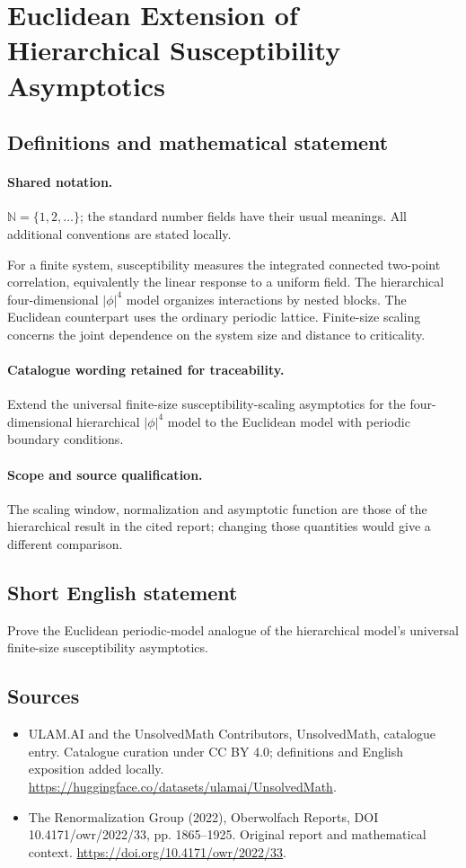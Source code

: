 \documentclass[11pt]{article}
\begin{document}
\section{Euclidean Extension of Hierarchical Susceptibility Asymptotics}\label{statement}

\subsection{Definitions and mathematical statement}

\paragraph{Shared notation.}$\mathbb N=\{1,2,\ldots\}$; the standard number fields have their usual meanings. All additional conventions are stated locally.


For a finite system, susceptibility measures the integrated connected two-point correlation, equivalently the linear response to a uniform field. The hierarchical four-dimensional $|\phi|^4$ model organizes interactions by nested blocks. The Euclidean counterpart uses the ordinary periodic lattice. Finite-size scaling concerns the joint dependence on the system size and distance to criticality.

\paragraph{Catalogue wording retained for traceability.}
Extend the universal finite-size susceptibility-scaling asymptotics for the four-dimensional hierarchical $|\phi|^4$ model to the Euclidean model with periodic boundary conditions.

\paragraph{Scope and source qualification.}The scaling window, normalization and asymptotic function are those of the hierarchical result in the cited report; changing those quantities would give a different comparison.
\subsection{Short English statement}
Prove the Euclidean periodic-model analogue of the hierarchical model's universal finite-size susceptibility asymptotics.
\subsection{Sources}
\begin{itemize}
\item[\hypertarget{source:statement:1}{S1}] ULAM.AI and the UnsolvedMath Contributors, UnsolvedMath, catalogue entry. Catalogue curation under CC BY 4.0; definitions and English exposition added locally.
\url{https://huggingface.co/datasets/ulamai/UnsolvedMath}.
\item[\hypertarget{source:statement:2}{S2}] The Renormalization Group (2022), Oberwolfach Reports, DOI 10.4171/owr/2022/33, pp. 1865--1925. Original report and mathematical context.
\url{https://doi.org/10.4171/owr/2022/33}.
\end{itemize}
\label{end:statement}
\end{document}

